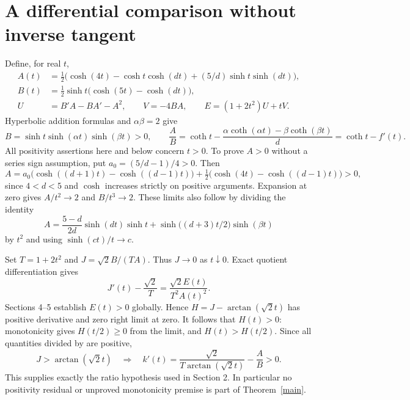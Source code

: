 \documentclass[11pt]{article}
\newcommand{\atan}{\operatorname{arctan}}
\newcommand{\cothh}{\operatorname{coth}}
\begin{document}
\section{A differential comparison without inverse tangent}
Define, for real $t$,
\begin{align*}
 A(t)&=\tfrac12\bigl(\cosh(4t)-\cosh t\cosh(dt)+(5/d)\sinh t\sinh(dt)\bigr),\\
 B(t)&=\tfrac12\sinh t\bigl(\cosh(5t)-\cosh(dt)\bigr),\\
 U&=B'A-BA'-A^2,\qquad V=-4BA,\qquad E=(1+2t^2)U+tV.
\end{align*}
Hyperbolic addition formulas and $\alpha\beta=2$ give
\[
 B=\sinh t\sinh(\alpha t)\sinh(\beta t)>0,\qquad
 \frac AB=\cothh t-\frac{\alpha\cothh(\alpha t)-\beta\cothh(\beta t)}d
 =\cothh t-f'(t).                                      \tag{2}
\]
All positivity assertions here and below concern $t>0$. To prove $A>0$ without a series sign assumption, put $a_0=(5/d-1)/4>0$. Then
\[
 A=a_0\bigl(\cosh((d+1)t)-\cosh((d-1)t)\bigr)
 +\tfrac12\bigl(\cosh(4t)-\cosh((d-1)t)\bigr)>0,
\]
since $4<d<5$ and $\cosh$ increases strictly on positive arguments. Expansion at zero gives $A/t^2\to2$ and $B/t^3\to2$. These limits also follow by dividing the identity
\[
 A=\frac{5-d}{2d}\sinh(dt)\sinh t
   +\sinh\bigl((d+3)t/2\bigr)\sinh(\beta t)
\]
by $t^2$ and using $\sinh(ct)/t\to c$.

Set $T=1+2t^2$ and $J=\sqrt2 B/(TA)$. Thus $J\to0$ as $t\downarrow0$. Exact quotient differentiation gives
\[
 J'(t)-\frac{\sqrt2}{T}
   =\frac{\sqrt2 E(t)}{T^2A(t)^2}.                       \tag{3}
\]
Sections 4--5 establish $E(t)>0$ globally. Hence $H=J-\atan(\sqrt2t)$ has positive derivative and zero right limit at zero. It follows that $H(t)>0$: monotonicity gives $H(t/2)\ge0$ from the limit, and $H(t)>H(t/2)$. Since all quantities divided by are positive,
\[
 J>\atan(\sqrt2t)
 \quad\Longrightarrow\quad
 k'(t)=\frac{\sqrt2}{T\atan(\sqrt2t)}-\frac AB>0.       \tag{4}
\]
This supplies exactly the ratio hypothesis used in Section 2. In particular no positivity residual or unproved monotonicity premise is part of Theorem~\ref{main}.
\newpage
\end{document}
